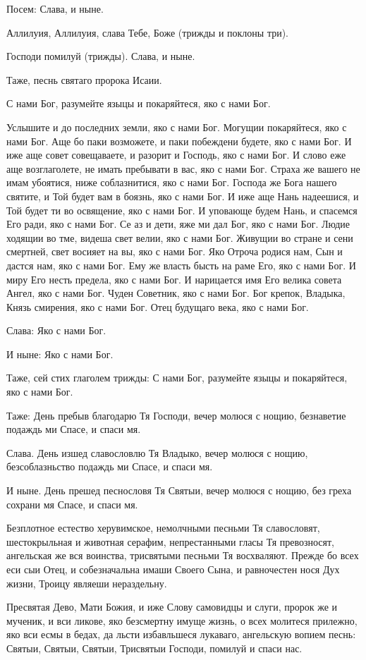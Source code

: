 Посем: Слава, и ныне. 

Аллилуия, Аллилуия, слава Тебе, Боже (трижды и поклоны три).

Господи помилуй (трижды). Слава, и ныне.

Таже, песнь святаго пророка Исаии.

С нами Бог, разумейте языцы и покаряйтеся, яко с нами Бог.

Услышите и до последних земли, яко с нами Бог. Могущии покаряйтеся, яко с нами Бог. Аще бо паки возможете, и паки побеждени будете, яко с нами Бог. И иже аще совет совещаваете, и разорит и Господь, яко с нами Бог. И слово еже аще возглаголете, не имать пребывати в вас, яко с нами Бог. Страха же вашего не имам убоятися, ниже соблазнитися, яко с нами Бог. Господа же Бога нашего святите, и Той будет вам в боязнь, яко с нами Бог. И иже аще Нань надеешися, и Той будет ти во освящение, яко с нами Бог. И уповающе будем Нань, и спасемся Его ради, яко с нами Бог. Се аз и дети, яже ми дал Бог, яко с нами Бог. Людие ходящии во тме, видеша свет велии, яко с нами Бог. Живущии во стране и сени смертней, свет восияет на вы, яко с нами Бог. Яко Отроча родися нам, Сын и дастся нам, яко с нами Бог. Ему же власть бысть на раме Его, яко с нами Бог. И миру Его несть предела, яко с нами Бог. И нарицается имя Его велика совета Ангел, яко с нами Бог. Чуден Советник, яко с нами Бог. Бог крепок, Владыка, Князь смирения, яко с нами Бог. Отец будущаго века, яко с нами Бог.

Слава: Яко с нами Бог.

И ныне: Яко с нами Бог. 

Таже, сей стих глаголем трижды: С нами Бог, разумейте языцы и покаряйтеся, яко с нами Бог. 

Таже: День пребыв благодарю Тя  Господи, вечер молюся с нощию, безнаветие подаждь ми Спасе, и спаси мя.

Слава. День изшед славословлю Тя Владыко, вечер молюся с нощию, безсоблазньство подаждь ми Спасе, и спаси мя.

И ныне. День прешед песнословя Тя Святыи, вечер молюся с нощию, без греха сохрани мя Спасе, и спаси мя.

Безплотное естество херувимское, немолчными песньми Тя славословят, шестокрыльная и животная серафим, непрестанными гласы Тя превозносят, ангельская же вся воинства, трисвятыми песньми Тя восхваляют. Прежде бо всех еси сыи Отец, и собезначальна имаши Своего Сына, и равночестен нося Дух жизни, Троицу являеши нераздельну.

Пресвятая Дево, Мати Божия, и иже Слову самовидцы и слуги, пророк же и мученик, и вси ликове, яко безсмертну имуще жизнь, о всех молитеся прилежно, яко вси есмы в бедах, да льсти избавльшеся лукаваго, ангельскую вопием песнь: Святыи, Святыи, Святыи, Трисвятыи Господи, помилуй и спаси нас. 

